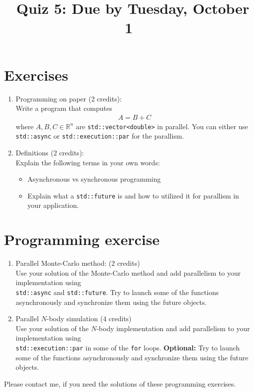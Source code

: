 \documentclass[11pt]{article}
\begin{document}
\title{\coursename~Quiz 5: Due by Tuesday, October 1}
\date{}
\maketitle

\medskip


\section*{Exercises}

\begin{enumerate}
\item Programming on paper (2 credits): \\
Write a program that computes
\begin{align*}
A = B + C
\end{align*}
where $A,B,C \in \mathbb{R}^n$ are \lstinline|std::vector<double>| in parallel. You can either use \lstinline{std::async} or \lstinline{std::execution::par} for the parallism.

\item Definitions (2 credits): \\
Explain the following terms in your own words:
\begin{itemize}
\item Asynchronous vs synchronous programming
\item Explain what a \lstinline|std::future| is and how to utilized it for parallism in your application.
\end{itemize}


\end{enumerate}

\section*{Programming exercise}

\begin{enumerate}

\item Parallel Monte-Carlo method: (2 credits)\\
Use your solution of the Monte-Carlo method and add parallelism to your implementation using \\
\lstinline|std::async| and \lstinline|std::future|. Try to launch some of the functions asynchronously and synchronize them using the future objects. 

\item Parallel $N$-body simulation (4 credits)\\
Use your solution of the $N$-body implementation and add parallelism to your implementation using \\
\lstinline|std::execution::par| in some of the \lstinline|for| loops. \textbf{Optional:} Try to launch some of the functions asynchronously and synchronize them using the future objects. 

\end{enumerate}
Please contact me, if you need the solutions of these programming exercises.
\doclicenseThis 
\end{document}
